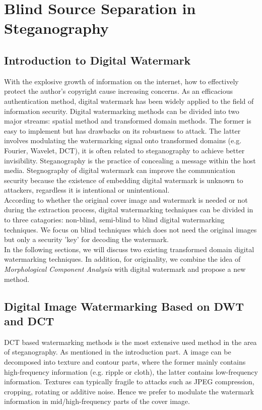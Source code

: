 \section{Blind Source Separation in Steganography}
\subsection{Introduction to Digital Watermark}
With the explosive growth of information on the internet, how to effectively protect the author's copyright cause increasing concerns. As an efficacious authentication method, digital watermark has been widely applied to the field of information security. Digital watermarking methods can be divided into two major streams: spatial method and transformed domain methods. The former is easy to implement but has drawbacks on its robustness to attack. The latter involves modulating the watermarking signal onto transformed domains (e.g. Fourier, Wavelet, DCT), it is often related to steganography to achieve better invisibility. Steganography is the practice of concealing a message within the host media. Stegnography of digital watermark can improve the communication security because the existence of embedding digital watermark is unknown to attackers, regardless it is intentional or unintentional. \\

According to whether the original cover image and watermark is needed or not during the extraction process, digital watermarking techniques can be divided in to three catagories: non-blind, semi-blind to blind digital watermarking techniques\cite{Yu2017}. We focus on blind techniques which does not need the original images but only a security 'key' for decoding the watermark.\\

In the following sections, we will discuss two existing transformed domain digital watermarking techniques. In addition, for originality, we combine the idea of \textit{Morphological Component Analysis} with digital watermark and propose a new method.

\subsection{Digital Image Watermarking Based on DWT and DCT}
DCT based watermarking methods is the most extensive used method in the area of steganography. As mentioned in the introduction part. A image can be decomposed into texture and contour parts, where the former mainly contains high-frequency information (e.g. ripple or cloth), the latter contains low-frequency information. Textures can typically fragile to attacks such as JPEG compression, cropping, rotating or additive noise.  Hence we prefer to modulate the watermark information in mid/high-frequency parts of the cover image.\\



